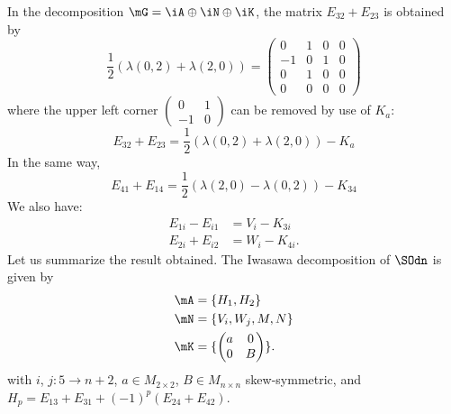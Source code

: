 In the decomposition $\mG=\iA\oplus\iN\oplus\iK$, the matrix $E_{32}+E_{23}$ is obtained by
\[
   \frac{1}{2}(\lambda(0,2)+\lambda(2,0))=\begin{pmatrix}
0 & 1 & 0 & 0 \\
-1 & 0 & 1 & 0 \\
0 & 1 & 0 & 0 \\
0 & 0 & 0 & 0
\end{pmatrix}
\]
where the upper left corner $\begin{pmatrix}0&1\\-1&0\end{pmatrix}$ can be removed by use of $K_a$:
\[
               E_{32}+E_{23}=\frac{1}{2}(\lambda(0,2)+\lambda(2,0))-K_a
\]
In the same way,
\[
             E_{41}+E_{14}=\frac{1}{2}(\lambda(2,0)-\lambda(0,2))-K_{34}
\]
We also have:
\begin{equation}
\begin{split}
         E_{1i}-E_{i1}&=V_i-K_{3i}\\
         E_{2i}+E_{i2}&=W_i-K_{4i}.
\end{split}
\end{equation} 
Let us summarize the result obtained.  The Iwasawa decomposition of $\SOdn$ is given by
\begin{subequations}\label{eq:Iwasawa_explicite}
\begin{align}
  \mA&=\{H_1,H_2\}\\
  \mN&=\{V_i,W_j,M,N\}\\
  \mK&=\{\begin{pmatrix}a&0\\0&B\end{pmatrix}\}.
\end{align}
\end{subequations}
with $i$, $j:5\to n+2$, $a\in M_{2\times 2}$, $B\in M_{n\times n}$ skew-symmetric, and
$H_p=E_{13}+E_{31}+(-1)^p(E_{24}+E_{42})$.

